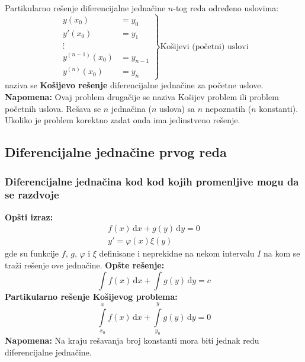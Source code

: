 \begin{definition}
	Partikularno rešenje diferencijalne jednačine $n$-tog reda određeno uslovima:
	$$\left.
	\begin{aligned}
		y(x_0) &= y_0\\
		y'(x_0) &= y_1\\
		\vdots\\
		y^{(n-1)}(x_0) &= y_{n-1}\\
		y^{(n)}(x_0) &= y_n
	\end{aligned}
	\right\} \text{Košijevi (početni) uslovi}
	$$
	naziva se \textbf{Košijevo rešenje} diferencijalne jednačine za početne uslove.\\
	\textbf{Napomena:} Ovaj problem drugačije se naziva Košijev problem ili problem početnih uslova. Rešava se $n$ jednačina ($n$ uslova) sa $n$ nepoznatih ($n$ konstanti). Ukoliko je problem korektno zadat onda ima jedinstveno rešenje.
\end{definition}


\subsection{Diferencijalne jednačine prvog reda}


\subsubsection{Diferencijalne jednačina kod kod kojih promenljive mogu da se razdvoje}
\textbf{Opšti izraz:}
\begin{gather*}
	f(x)\, \mathrm{d}x +g(y)\, \mathrm{d}y = 0\\
	y' = \varphi(x)\xi(y)
\end{gather*}
gde su funkcije $f$, $g$, $\varphi$ i $\xi$ definisane i neprekidne na nekom intervalu $I$ na kom se traži rešenje ove jednačine.
\textbf{Opšte rešenje:}
$$\int f(x) \, \mathrm{d}x + \int g(y) \, \mathrm{d}y = c$$
\textbf{Partikularno rešenje Košijevog problema:}
$$\int \limits^x_{x_0} f(x) \, \mathrm{d}x +\int \limits^y_{y_0} g(y) \, \mathrm{d}y = 0$$
\textbf{Napomena:} Na kraju rešavanja broj konstanti mora biti jednak redu diferencijalne jednačine.


